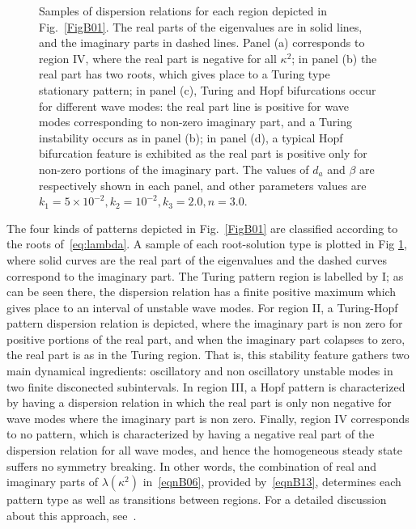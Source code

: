 \documentclass[%
 preprint,
 amsmath,amssymb,
 aps,
]{revtex4-2}
\begin{document}
\begin{figure}[t!]
	\caption{Samples of dispersion relations for each region depicted in Fig.~\ref{FigB01}. The real parts of the eigenvalues are in solid lines, and the imaginary parts in dashed lines.  Panel (a) corresponds to region IV, where the real part is negative for all $\kappa^2$; in panel (b) the real part has two roots, which gives place to a Turing type stationary pattern; in panel (c), Turing and Hopf bifurcations occur for different wave modes: the real part line is positive for wave modes corresponding to non-zero imaginary part, and a Turing instability occurs as in panel (b); in  panel (d), a typical Hopf bifurcation feature is exhibited as the real part is positive only for non-zero portions of the imaginary part. The values of $d_a$ and $\beta$ are respectively shown in each panel, and other parameters values are $k_1=5\times10^{-2}, k_2=10^{-2}, k_3=2.0, n=3.0$.}
	\label{FigB02}
\end{figure}

The four kinds of patterns depicted in Fig.~\ref{FigB01} are classified according to the roots of~\eqref{eq:lambda}. A sample of each root-solution type is plotted in Fig \ref{FigB02}, where solid curves are  the real part of the eigenvalues and the dashed curves correspond to the imaginary part. The Turing pattern region is labelled by I; as can be seen there, the dispersion relation has a finite positive maximum which gives place to an interval of unstable wave modes. For region II, a Turing-Hopf pattern dispersion relation is depicted, where the imaginary part is non zero for positive portions of the real part, and when the imaginary part colapses to zero, the real part is as in the Turing region. That is, this stability feature gathers two main dynamical ingredients: oscillatory and non oscillatory unstable modes in two finite disconected subintervals. In region III, a Hopf pattern is characterized by having a dispersion relation in which the real part is only non negative for wave modes where the imaginary part is non zero. Finally, region IV corresponds to no pattern, which is characterized by having a negative real part of the dispersion relation for all wave modes, and hence the homogeneous steady state suffers no symmetry breaking. In other words, the combination of real and imaginary parts of $\lambda(\kappa^2)$ in~\eqref{eqnB06}, provided by~\eqref{eqnB13}, determines each pattern type as well as transitions between regions. For a detailed discussion about this approach, see~\citep{liu}.
\end{document}
